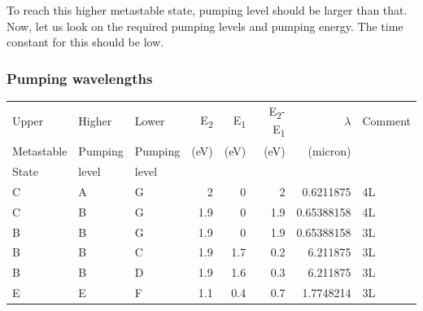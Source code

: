 \documentclass[a4paper,11pt]{article}
\begin{document}
To reach this higher metastable state, pumping level should be larger than that. Now, let us look on the required pumping levels and pumping energy. The time constant for this should be low.

\subsubsection*{Pumping wavelengths}
\label{sec:org8a901c5}
\begin{center}
\begin{tabular}{lllrrrrl}
\hline
Upper & Higher & Lower & E\textsubscript{2} & E\textsubscript{1} & E\textsubscript{2}-E\textsubscript{1} & \(\lambda\) & Comment\\
Metastable & Pumping & Pumping & (eV) & (eV) & (eV) & (micron) & \\
State & level & level &  &  &  &  & \\
\hline
C & A & G & 2 & 0 & 2 & 0.6211875 & 4L\\
C & B & G & 1.9 & 0 & 1.9 & 0.65388158 & 4L\\
B & B & G & 1.9 & 0 & 1.9 & 0.65388158 & 3L\\
B & B & C & 1.9 & 1.7 & 0.2 & 6.211875 & 3L\\
B & B & D & 1.9 & 1.6 & 0.3 & 6.211875 & 3L\\
E & E & F & 1.1 & 0.4 & 0.7 & 1.7748214 & 3L\\
\hline
\end{tabular}
\end{center}
\end{document}
